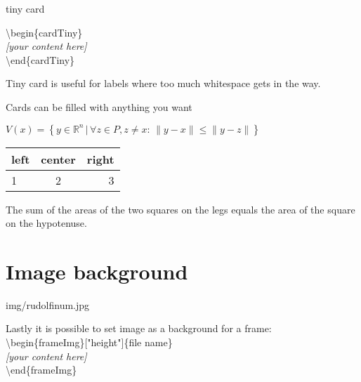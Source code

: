 \documentclass[9pt, aspectratio=169]{beamer}
\begin{document}
\begin{frame}{tiny card}
\begin{cardTiny}
\end{cardTiny}

\begin{card}
{\color{primary} \textbackslash begin\{cardTiny\}\\[2mm]}
\null\qquad \textit{[your content here]}\\[2mm]
{\color{primary} \textbackslash end\{cardTiny\}}
\end{card}
\begin{card}
Tiny card is useful for labels where too much whitespace gets in the way. 
\end{card}
\end{frame}

\begin{frame}{Cards can be filled with anything you want}

\begin{card}
\centering$V(x) = \left\{ y \in \mathbb{R}^n \,|\, \forall z \in P, z\neq x:\, \|y-x\|\leq\|y-z\| \right\}$
\end{card}

\begin{card}
\centering
\begin{tabular}{lcr}
left & center & right \\
\hline
1 & 2 & 3 \\
\end{tabular}
\end{card}

\begin{card}
\begin{theorem}[Pythagorean]
The sum of the areas of the two squares on the legs equals the area of the square on the hypotenuse.
\end{theorem}
\end{card}
\end{frame}

\section{Image background}
\begin{frameImg}{img/rudolfinum.jpg}
\vspace*{60mm}
\begin{cardTiny}
Lastly it is possible to set image as a background for a frame:\\[2mm]
{\color{primary} \textbackslash begin\{frameImg\}["height"]\{file name\}\\[2mm]}
\null\qquad \textit{[your content here]}\\[2mm]
{\color{primary} \textbackslash end\{frameImg\}}
\end{cardTiny}
\end{frameImg}
\end{document}
